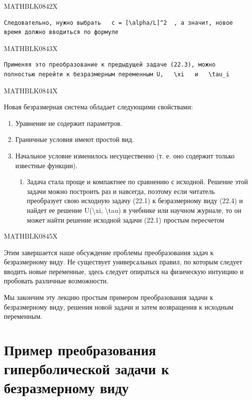 \documentclass[
]{article}
\providecommand{\tightlist}{%
  \setlength{\itemsep}{0pt}\setlength{\parskip}{0pt}}
\begin{document}
{{MATHBLK0842X

\begin{verbatim}
Следовательно, нужно выбрать   c = [\alpha/L]^2  , а значит, новое время должно вводиться по формуле
\end{verbatim}

MATHBLK0843X

\begin{verbatim}
Применяя это преобразование к предыдущей задаче (22.3), можно полностью перейти к безразмерным переменным U,   \xi   и   \tau_i 
\end{verbatim}

MATHBLK0844X

Новая безразмерная система обладает следующими свойствами:

\begin{enumerate}
\def\labelenumi{\arabic{enumi}.}
\item
  Уравнение не содержит параметров.
\item
  Граничные условия имеют простой вид.
\item
  Начальное условие изменилось несущественно (т. е. оно содержит только
  известные функции).

  \begin{enumerate}
  \def\labelenumii{\arabic{enumii}.}
  \setcounter{enumii}{3}
  \tightlist
  \item
    Задача стала проще и компактнее по сравнению с исходной. Решение
    этой задачи можно построить раз и навсегда, поэтому если читатель
    преобразует свою исходную задачу (22.1) к безразмерному виду (22.4)
    и найдет ее решение U(\textbackslash xi, \textbackslash tau) в
    учебнике или научном журнале, то он может найти решение исходной
    задачи (22.1) простым пересчетом
  \end{enumerate}
\end{enumerate}

MATHBLK0845X

Этим завершается наше обсуждение проблемы преобразования задач к
безразмерному виду. Не существует универсальных правил, по которым
следует вводить новые переменные, здесь следует опираться на физическую
интуицию и пробовать различные возможности.

Мы закончим эту лекцию простым примером преобразования задачи к
безразмерному виду, решения новой задачи и затем возвращения к исходным
переменным.

\section{Пример преобразования гиперболической задачи к безразмерному
виду}\label{ux43fux440ux438ux43cux435ux440-ux43fux440ux435ux43eux431ux440ux430ux437ux43eux432ux430ux43dux438ux44f-ux433ux438ux43fux435ux440ux431ux43eux43bux438ux447ux435ux441ux43aux43eux439-ux437ux430ux434ux430ux447ux438-ux43a-ux431ux435ux437ux440ux430ux437ux43cux435ux440ux43dux43eux43cux443-ux432ux438ux434ux443}

}}
\end{document}
